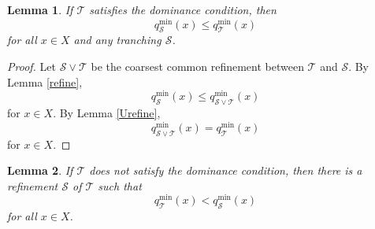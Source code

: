 \documentclass[11pt]{article}
\theoremstyle{plain}
\newtheorem{lmm}{Lemma}%
\begin{document}
\begin{lmm} \label{prp:Ucon}
If $\mathcal{T}$ satisfies the dominance condition, then
\begin{equation*}
q_{\mathcal{S}}^{\min}(x)\leq q_{\mathcal{T}}^{\min}(x)
\end{equation*}
for all $x\in X$ and any tranching $\mathcal{S}$.
\end{lmm}

\begin{proof}
Let $\mathcal{S}\vee\mathcal{T}$ be the coarsest common refinement between $\mathcal{T}$ and $\mathcal{S}$.
By Lemma \ref{refine},
\begin{equation*}
q_{\mathcal{S}}^{\min}(x) \leq q_{\mathcal{S}\vee\mathcal{T}}^{\min}(x)
\end{equation*}
for $x\in X$.
By Lemma \ref{Urefine},
\begin{equation*}
q_{\mathcal{S}\vee\mathcal{T}}^{\min}(x)= q_{\mathcal{T}}^{\min}(x)
\end{equation*}
for $x\in X$.
\end{proof}

\begin{lmm} \label{prp:nUcon}
If $\mathcal{T}$ does not satisfy the dominance condition, then there is a refinement $\mathcal{S}$ of $\mathcal{T}$ such that
\begin{equation*}
q_{\mathcal{T}}^{\min}(x)<q_{\mathcal{S}}^{\min}(x)
\end{equation*}
for all $x\in X$.
\end{lmm}
\end{document}
